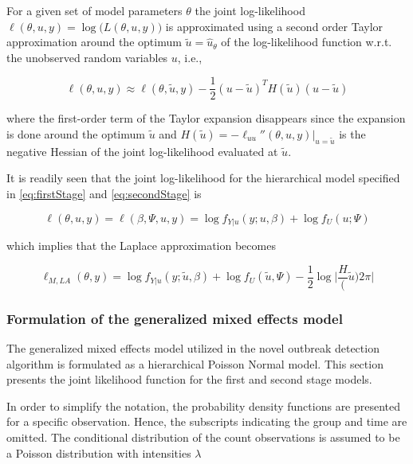 \documentclass[preprint, 3p, authoryear]{elsarticle} %
\begin{document}
For a given set of model parameters \(\theta\) the joint log-likelihood \(\ell(\theta, u, y)=\log\big(L(\theta, u, y)\big)\) is approximated using a second order Taylor approximation around the optimum \(\tilde{u}=\hat{u}_\theta\) of the log-likelihood function w.r.t. the unobserved random variables \(u\), i.e.,

\begin{equation}\label{eq:laplaceApprox}
  \ell(\theta, u, y)\approx\ell(\theta, \tilde{u}, y) - \frac{1}{2}(u-\tilde{u})^T H(\tilde{u})(u-\tilde{u})
\end{equation}

where the first-order term of the Taylor expansion disappears since the expansion is done around the optimum \(\tilde {u}\) and \(H(\tilde{u})=-\ell_{uu}''(\theta, u, y)|_{u=\tilde{u}}\) is the negative Hessian of the joint log-likelihood evaluated at \(\tilde{u}\).

It is readily seen that the joint log-likelihood for the hierarchical model specified in \ref{eq:firstStage} and \ref{eq:secondStage} is

\begin{equation}
  \ell(\theta, u, y) = \ell(\beta, \Psi, u, y) = \log f_{Y|u}(y;u,\beta)+\log f_U(u;\Psi)
\end{equation}

which implies that the Laplace approximation becomes

\begin{equation}
  \ell_{M,LA}(\theta, y)=\log f_{Y|u}(y; \tilde{u},\beta)+\log f_U(\tilde{u}, \Psi)-\frac{1}{2}\log\Bigg|\frac{H}(\tilde{u}){2\pi}\Bigg|
\end{equation}

\hypertarget{formulation-of-the-generalized-mixed-effects-model}{%
\subsubsection{Formulation of the generalized mixed effects model}\label{formulation-of-the-generalized-mixed-effects-model}}

The generalized mixed effects model utilized in the novel outbreak detection algorithm is formulated as a hierarchical Poisson Normal model. This section presents the joint likelihood function for the first and second stage models.

In order to simplify the notation, the probability density functions are presented for a specific observation. Hence, the subscripts indicating the group and time are omitted. The conditional distribution of the count observations is assumed to be a Poisson distribution with intensities \(\lambda\)
\end{document}
